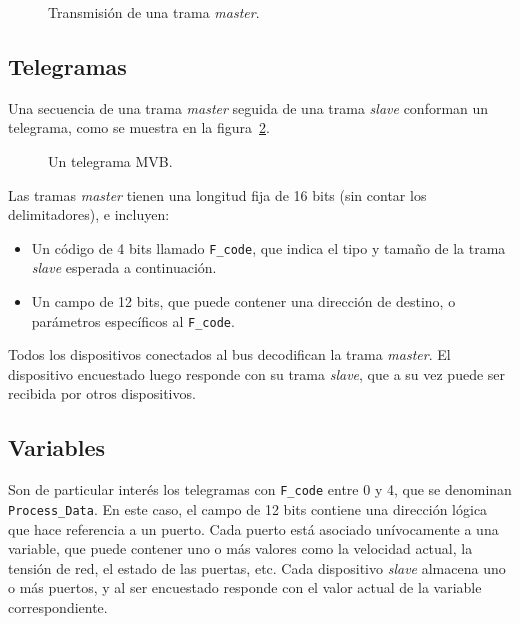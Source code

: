 \begin{figure}[htbp]
	\centering
    {
        \fontsize{8pt}{8pt}\selectfont
        
    }
	\caption[Transmisión de una trama master]{Transmisión de una trama \textit{master}.}
    \label{fig:manchester}
\end{figure}


\subsection{Telegramas}

Una secuencia de una trama \textit{master} seguida de una trama \textit{slave} conforman un telegrama, como se muestra en la figura~\ref{fig:telegrama}.

\begin{figure}[htbp]
	\centering
    {
        \fontsize{8pt}{8pt}\selectfont
        
    }
	\caption[Un telegrama MVB]{Un telegrama MVB.}
    \label{fig:telegrama}
\end{figure}

Las tramas \textit{master} tienen una longitud fija de 16 bits (sin contar los delimitadores), e incluyen:

\begin{itemize}
\item Un código de 4 bits llamado \texttt{F\_code}, que indica el tipo y tamaño de la trama \textit{slave} esperada a continuación.
\item Un campo de 12 bits, que puede contener una dirección de destino, o parámetros específicos al \texttt{F\_code}.
\end{itemize}

Todos los dispositivos conectados al bus decodifican la trama \textit{master}. El dispositivo encuestado luego responde con su trama \textit{slave}, que a su vez puede ser recibida por otros dispositivos.

\subsection{Variables}

Son de particular interés los telegramas con \texttt{F\_code} entre 0 y 4, que se denominan \texttt{Process\_Data}.
En este caso, el campo de 12 bits contiene una dirección lógica que hace referencia a un puerto.
Cada puerto está asociado unívocamente a una variable, que puede contener uno o más valores como la velocidad actual, la tensión de red, el estado de las puertas, etc.
Cada dispositivo \textit{slave} almacena uno o más puertos, y al ser encuestado responde con el valor actual de la variable correspondiente.

